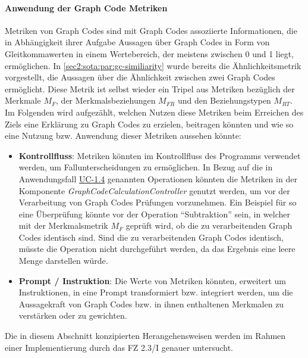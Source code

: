 \paragraph{Anwendung der Graph Code Metriken}
Metriken von Graph Codes sind mit Graph Codes assoziierte Informationen, die in Abhängigkeit ihrer Aufgabe Aussagen über Graph Codes in Form von Gleitkommawerten in einem Wertebereich, der meistens zwischen 0 und 1 liegt, ermöglichen. In \cref{sec2:sota:par:gc-similiarity} wurde bereits die Ähnlichkeitsmetrik vorgestellt, die Aussagen über die Ähnlichkeit zwischen zwei Graph Codes ermöglicht.
Diese Metrik ist selbst wieder ein Tripel aus Metriken bezüglich der Merkmale $M_F$, der Merkmalsbeziehungen $M_{FR}$ und den Beziehungstypen $M_{RT}$.
Im Folgenden wird aufgezählt, welchen Nutzen diese Metriken beim Erreichen des Ziels eine Erklärung zu Graph Codes zu erzielen, beitragen könnten und wie so eine Nutzung bzw. Anwendung dieser Metriken aussehen könnte:
\begin{itemize}
    \item \textbf{Kontrollfluss}: Metriken könnten im Kontrollfluss des Programms verwendet werden, um Fallunterscheidungen zu ermöglichen.
    In Bezug auf die in Anwendungsfall \hyperref[sec3:model:uc-1.4]{UC-1.4} genannten Operationen könnten die Metriken in der Komponente \textit{GraphCodeCalculationController} genutzt werden, um vor der Verarbeitung von Graph Codes Prüfungen vorzunehmen.
    Ein Beispiel für so eine Überprüfung könnte vor der Operation \enquote{Subtraktion} sein, in welcher mit der Merkmalsmetrik $M_F$ geprüft wird, ob die zu verarbeitenden Graph Codes identisch sind.
    Sind die zu verarbeitenden Graph Codes identisch, müsste die Operation nicht durchgeführt werden, da das Ergebnis eine leere Menge darstellen würde.
    \item \textbf{Prompt / Instruktion}: Die Werte von Metriken könnten, erweitert um Instruktionen, in eine Prompt transformiert bzw. integriert werden, um die Aussagekraft von Graph Codes bzw. in ihnen enthaltenen Merkmalen zu verstärken oder zu gewichten.
\end{itemize}



Die in diesem Abschnitt konzipierten Herangehensweisen werden im Rahmen einer Implementierung durch das FZ 2.3/I genauer untersucht.


